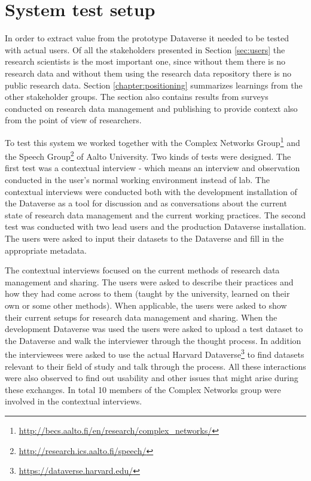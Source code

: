 \section{System test setup}
\label{sec:system_testing}

In order to extract value from the prototype Dataverse it needed to be tested
with actual users. Of all the stakeholders presented in Section \ref{sec:users}
the research scientists is the most important one, since without them there is
no research data and without them using the research data repository there is
no public research data. Section \ref{chapter:positioning} summarizes learnings
from the other stakeholder groups. The section also contains results from
surveys conducted on research data management and publishing to provide context
also from the point of view of researchers.

To test this system we worked together with the Complex Networks
Group\footnote{\url{http://becs.aalto.fi/en/research/complex\_networks/}} and the
Speech Group\footnote{\url{http://research.ics.aalto.fi/speech/}} of Aalto
University. Two kinds of tests were designed. The first test was a contextual
interview - which means an interview and observation conducted in the user's normal working
environment instead of lab. The contextual interviews were conducted both with
the development installation of the Dataverse as a tool for discussion and as
conversations about the current state of research data management and the
current working practices. The second test was conducted with two lead users
and the production Dataverse installation. The users were asked to input their
datasets to the Dataverse and fill in the appropriate metadata.

The contextual interviews focused on the current methods of research data
management and sharing. The users were asked to describe their practices and
how they had come across to them (taught by the university, learned on their
own or some other methods). When applicable, the users were asked to show
their current setups for research data management and sharing. When the
development Dataverse was used the users were asked to upload a test dataset
to the Dataverse and walk the interviewer through the thought process. In
addition the interviewees were asked to use the actual Harvard
Dataverse\footnote{\url{https://dataverse.harvard.edu/}} to find datasets
relevant to their field of study and talk through the process. All these
interactions were also observed to find out usability and other issues that
might arise during these exchanges. In total 10 members of the Complex
Networks group were involved in the contextual interviews.


